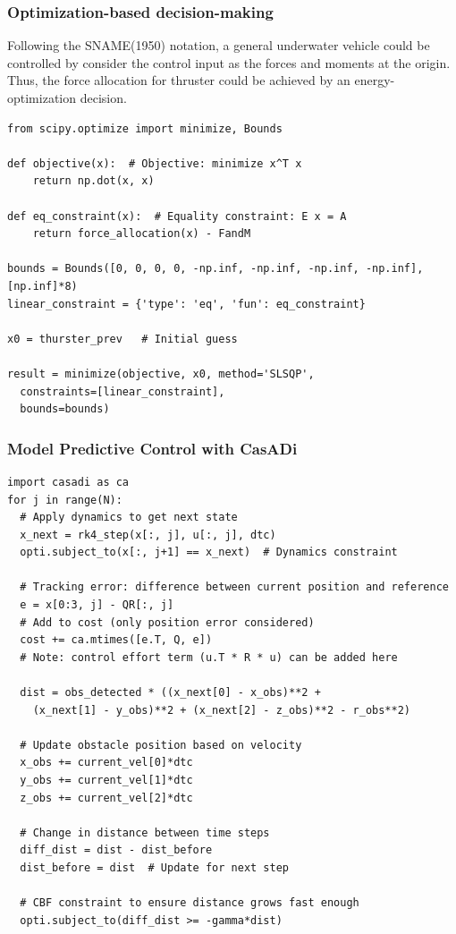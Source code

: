 \documentclass[9pt]{beamer}
\begin{document}
			
			
			    
			
			\begin{frame}[fragile]
				\frametitle{Optimization-based decision-making}
				Following the SNAME(1950) notation, a general underwater vehicle could be controlled by consider the control input as the forces and moments at the origin. Thus, the force allocation for thruster could be achieved by an energy-optimization decision.
				\begin{verbatim}
from scipy.optimize import minimize, Bounds
					
def objective(x):  # Objective: minimize x^T x
	return np.dot(x, x)		
	
def eq_constraint(x):  # Equality constraint: E x = A
	return force_allocation(x) - FandM 		

bounds = Bounds([0, 0, 0, 0, -np.inf, -np.inf, -np.inf, -np.inf], [np.inf]*8)
linear_constraint = {'type': 'eq', 'fun': eq_constraint}

x0 = thurster_prev   # Initial guess

result = minimize(objective, x0, method='SLSQP',
  constraints=[linear_constraint],
  bounds=bounds)
				\end{verbatim}
			\end{frame}
		
		\begin{frame}[fragile]
			\frametitle{Model Predictive Control with CasADi}
			\begin{verbatim}
import casadi as ca
for j in range(N):
  # Apply dynamics to get next state
  x_next = rk4_step(x[:, j], u[:, j], dtc)
  opti.subject_to(x[:, j+1] == x_next)  # Dynamics constraint

  # Tracking error: difference between current position and reference
  e = x[0:3, j] - QR[:, j]
  # Add to cost (only position error considered)
  cost += ca.mtimes([e.T, Q, e])
  # Note: control effort term (u.T * R * u) can be added here

  dist = obs_detected * ((x_next[0] - x_obs)**2 + 
    (x_next[1] - y_obs)**2 + (x_next[2] - z_obs)**2 - r_obs**2)

  # Update obstacle position based on velocity
  x_obs += current_vel[0]*dtc
  y_obs += current_vel[1]*dtc
  z_obs += current_vel[2]*dtc

  # Change in distance between time steps
  diff_dist = dist - dist_before
  dist_before = dist  # Update for next step

  # CBF constraint to ensure distance grows fast enough
  opti.subject_to(diff_dist >= -gamma*dist)
			\end{verbatim}
		\end{frame}
	
\end{document}
